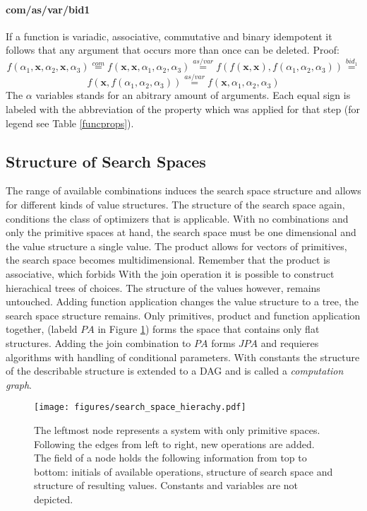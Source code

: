\documentclass[english]{article}
\begin{document}
\paragraph{com/as/var/bid1}
If a function is variadic, associative, commutative and binary idempotent it follows that any argument that occurs more than once can be deleted. Proof:
$$f(\alpha_1, \mathbf{x}, \alpha_2, \mathbf{x}, \alpha_3) \stackrel{com}{=}
f(\mathbf{x},\mathbf{x}, \alpha_1, \alpha_2, \alpha_3) \stackrel{as/var}{=}
f(f(\mathbf{x},\mathbf{x}), f(\alpha_1, \alpha_2, \alpha_3)) \stackrel{bid_1}{=}$$
$$f(\mathbf{x}, f(\alpha_1, \alpha_2, \alpha_3)) \stackrel{as/var}{=}
f(\mathbf{x}, \alpha_1, \alpha_2, \alpha_3)$$
The $\alpha$ variables stands for an abitrary amount of arguments. Each equal sign is labeled with the abbreviation of the property which was applied for that step (for legend see Table \ref{funcprops}).


\subsection{Structure of Search Spaces}
The range of available combinations induces the search space structure and allows for different kinds of value structures. The structure of the search space again, conditions the class of optimizers that is applicable.
With no combinations and only the primitive spaces at hand, the search space must be one dimensional and the value structure a single value.
The product allows for vectors of primitives, the search space becomes multidimensional. Remember that the product is associative, which forbids
With the join operation it is possible to construct hierachical trees of choices. The structure of the values however, remains untouched.
Adding function application changes the value structure to a tree, the search space structure remains.
Only primitives, product and function application together, (labeld $PA$ in Figure \ref{space_structure}) forms the space that contains only flat structures. Adding the join combination to $PA$ forms $JPA$ and requieres algorithms with handling of conditional parameters.
With constants the structure of the describable structure is extended to a DAG and is called a \textit{computation graph}.


\begin{figure}
\texttt{[image: figures/search\_space\_hierachy.pdf]}

  \caption{The leftmost node represents a system with only primitive spaces. Following the edges from left to right, new operations are added. The field of a node holds the following information from top to bottom: initials of available operations, structure of search space and structure of resulting values. Constants and variables are not depicted.}
  \label{space_structure}
\end{figure}
\end{document}

